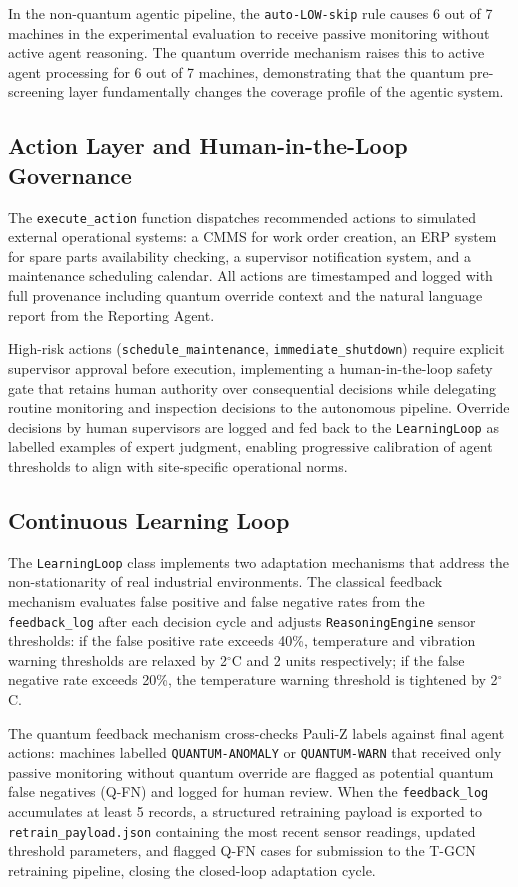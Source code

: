 In the non-quantum agentic pipeline, the \texttt{auto-LOW-skip} rule causes 6 out of 7 machines in the experimental evaluation to receive passive monitoring without active agent reasoning. The quantum override mechanism raises this to active agent processing for 6 out of 7 machines, demonstrating that the quantum pre-screening layer fundamentally changes the coverage profile of the agentic system.

\subsection{Action Layer and Human-in-the-Loop Governance}

The \texttt{execute\_action} function dispatches recommended actions to simulated external operational systems: a CMMS for work order creation, an ERP system for spare parts availability checking, a supervisor notification system, and a maintenance scheduling calendar. All actions are timestamped and logged with full provenance including quantum override context and the natural language report from the Reporting Agent.

High-risk actions (\texttt{schedule\_maintenance}, \texttt{immediate\_shutdown}) require explicit supervisor approval before execution, implementing a human-in-the-loop safety gate that retains human authority over consequential decisions while delegating routine monitoring and inspection decisions to the autonomous pipeline. Override decisions by human supervisors are logged and fed back to the \texttt{LearningLoop} as labelled examples of expert judgment, enabling progressive calibration of agent thresholds to align with site-specific operational norms.

\subsection{Continuous Learning Loop}

The \texttt{LearningLoop} class implements two adaptation mechanisms that address the non-stationarity of real industrial environments. The classical feedback mechanism evaluates false positive and false negative rates from the \texttt{feedback\_log} after each decision cycle and adjusts \texttt{ReasoningEngine} sensor thresholds: if the false positive rate exceeds 40\%, temperature and vibration warning thresholds are relaxed by 2$^\circ$C and 2 units respectively; if the false negative rate exceeds 20\%, the temperature warning threshold is tightened by 2$^\circ$C.

The quantum feedback mechanism cross-checks Pauli-Z labels against final agent actions: machines labelled \texttt{QUANTUM-ANOMALY} or \texttt{QUANTUM-WARN} that received only passive monitoring without quantum override are flagged as potential quantum false negatives (Q-FN) and logged for human review. When the \texttt{feedback\_log} accumulates at least 5 records, a structured retraining payload is exported to \texttt{retrain\_payload.json} containing the most recent sensor readings, updated threshold parameters, and flagged Q-FN cases for submission to the T-GCN retraining pipeline, closing the closed-loop adaptation cycle.
